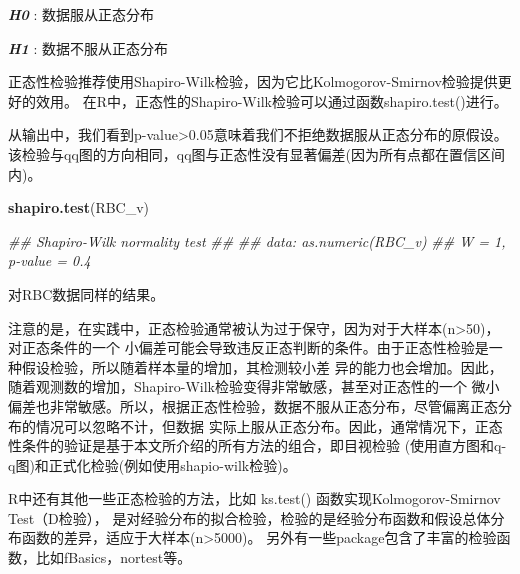 \documentclass[
]{article}
\newenvironment{Shaded}{\begin{snugshade}}{\end{snugshade}}
\newcommand{\CommentTok}[1]{\textcolor[rgb]{0.56,0.35,0.01}{\textit{#1}}}
\newcommand{\DataTypeTok}[1]{\textcolor[rgb]{0.13,0.29,0.53}{#1}}
\newcommand{\DecValTok}[1]{\textcolor[rgb]{0.00,0.00,0.81}{#1}}
\newcommand{\KeywordTok}[1]{\textcolor[rgb]{0.13,0.29,0.53}{\textbf{#1}}}
\newcommand{\NormalTok}[1]{#1}
\newcommand{\OperatorTok}[1]{\textcolor[rgb]{0.81,0.36,0.00}{\textbf{#1}}}
\newcommand{\StringTok}[1]{\textcolor[rgb]{0.31,0.60,0.02}{#1}}
\begin{document}
\textbf{\emph{H0}} : 数据服从正态分布

\textbf{\emph{H1}} : 数据不服从正态分布

正态性检验推荐使用Shapiro-Wilk检验，因为它比Kolmogorov-Smirnov检验提供更好的效用。
在R中，正态性的Shapiro-Wilk检验可以通过函数shapiro.test()进行。

\begin{Shaded}
\end{Shaded}

从输出中，我们看到p-value\textgreater0.05意味着我们不拒绝数据服从正态分布的原假设。
该检验与qq图的方向相同，qq图与正态性没有显著偏差(因为所有点都在置信区间内)。

\begin{Shaded}
\begin{Highlighting}[]
\KeywordTok{shapiro.test}\NormalTok{(RBC_v)}

\CommentTok{##      Shapiro-Wilk normality test}
\CommentTok{##  }
\CommentTok{##  data:  as.numeric(RBC_v)}
\CommentTok{##  W = 1, p-value = 0.4}
\end{Highlighting}
\end{Shaded}

对RBC数据同样的结果。

注意的是，在实践中，正态检验通常被认为过于保守，因为对于大样本(n\textgreater50)，对正态条件的一个
小偏差可能会导致违反正态判断的条件。由于正态性检验是一种假设检验，所以随着样本量的增加，其检测较小差
异的能力也会增加。因此，随着观测数的增加，Shapiro-Wilk检验变得非常敏感，甚至对正态性的一个
微小偏差也非常敏感。所以，根据正态性检验，数据不服从正态分布，尽管偏离正态分布的情况可以忽略不计，但数据
实际上服从正态分布。因此，通常情况下，正态性条件的验证是基于本文所介绍的所有方法的组合，即目视检验
(使用直方图和q-q图)和正式化检验(例如使用shapio-wilk检验)。

R中还有其他一些正态检验的方法，比如 ks.test() 函数实现Kolmogorov-Smirnov Test（D检验），
是对经验分布的拟合检验，检验的是经验分布函数和假设总体分布函数的差异，适应于大样本(n\textgreater5000)。
另外有一些package包含了丰富的检验函数，比如fBasics，nortest等。
\end{document}
